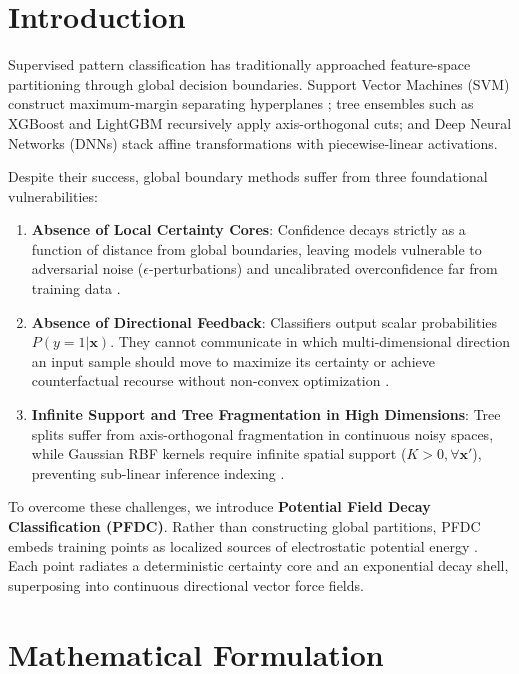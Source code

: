 \documentclass[11pt,a4paper]{article}
\begin{document}
\section{Introduction}
Supervised pattern classification has traditionally approached feature-space partitioning through global decision boundaries. Support Vector Machines (SVM) construct maximum-margin separating hyperplanes \cite{cortes1995support}; tree ensembles such as XGBoost \cite{chen2016xgboost} and LightGBM \cite{ke2017lightgbm} recursively apply axis-orthogonal cuts; and Deep Neural Networks (DNNs) stack affine transformations with piecewise-linear activations. 

Despite their success, global boundary methods suffer from three foundational vulnerabilities:
\begin{enumerate}
    \item \textbf{Absence of Local Certainty Cores}: Confidence decays strictly as a function of distance from global boundaries, leaving models vulnerable to adversarial noise ($\epsilon$-perturbations) and uncalibrated overconfidence far from training data \cite{goodfellow2014explaining}.
    \item \textbf{Absence of Directional Feedback}: Classifiers output scalar probabilities $P(y=1|\mathbf{x})$. They cannot communicate in which multi-dimensional direction an input sample should move to maximize its certainty or achieve counterfactual recourse without non-convex optimization \cite{wachter2017counterfactual}.
    \item \textbf{Infinite Support and Tree Fragmentation in High Dimensions}: Tree splits suffer from axis-orthogonal fragmentation in continuous noisy spaces, while Gaussian RBF kernels require infinite spatial support ($K > 0, \forall \mathbf{x}'$), preventing sub-linear inference indexing \cite{omohundro1989five}.
\end{enumerate}

To overcome these challenges, we introduce \textbf{Potential Field Decay Classification (PFDC)}. Rather than constructing global partitions, PFDC embeds training points as localized sources of electrostatic potential energy \cite{aizerman1964theoretical}. Each point radiates a deterministic certainty core and an exponential decay shell, superposing into continuous directional vector force fields.

\section{Mathematical Formulation}
\end{document}
